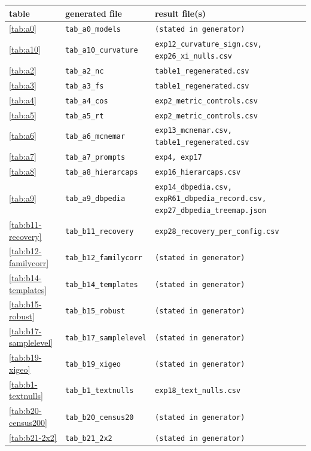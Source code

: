 \begin{table}[H]
\centering
\scriptsize
\begin{tabular}{lll}
\toprule
table & generated file & result file(s) \\
\midrule
\ref{tab:a0} & \texttt{tab\_a0\_models} & \texttt{(stated in generator)} \\
\ref{tab:a10} & \texttt{tab\_a10\_curvature} & \texttt{exp12\_curvature\_sign.csv, exp26\_xi\_nulls.csv} \\
\ref{tab:a2} & \texttt{tab\_a2\_nc} & \texttt{table1\_regenerated.csv} \\
\ref{tab:a3} & \texttt{tab\_a3\_fs} & \texttt{table1\_regenerated.csv} \\
\ref{tab:a4} & \texttt{tab\_a4\_cos} & \texttt{exp2\_metric\_controls.csv} \\
\ref{tab:a5} & \texttt{tab\_a5\_rt} & \texttt{exp2\_metric\_controls.csv} \\
\ref{tab:a6} & \texttt{tab\_a6\_mcnemar} & \texttt{exp13\_mcnemar.csv, table1\_regenerated.csv} \\
\ref{tab:a7} & \texttt{tab\_a7\_prompts} & \texttt{exp4, exp17} \\
\ref{tab:a8} & \texttt{tab\_a8\_hierarcaps} & \texttt{exp16\_hierarcaps.csv} \\
\ref{tab:a9} & \texttt{tab\_a9\_dbpedia} & \texttt{exp14\_dbpedia.csv, expR61\_dbpedia\_record.csv, exp27\_dbpedia\_treemap.json} \\
\ref{tab:b11-recovery} & \texttt{tab\_b11\_recovery} & \texttt{exp28\_recovery\_per\_config.csv} \\
\ref{tab:b12-familycorr} & \texttt{tab\_b12\_familycorr} & \texttt{(stated in generator)} \\
\ref{tab:b14-templates} & \texttt{tab\_b14\_templates} & \texttt{(stated in generator)} \\
\ref{tab:b15-robust} & \texttt{tab\_b15\_robust} & \texttt{(stated in generator)} \\
\ref{tab:b17-samplelevel} & \texttt{tab\_b17\_samplelevel} & \texttt{(stated in generator)} \\
\ref{tab:b19-xigeo} & \texttt{tab\_b19\_xigeo} & \texttt{(stated in generator)} \\
\ref{tab:b1-textnulls} & \texttt{tab\_b1\_textnulls} & \texttt{exp18\_text\_nulls.csv} \\
\ref{tab:b20-census200} & \texttt{tab\_b20\_census20} & \texttt{(stated in generator)} \\
\ref{tab:b21-2x2} & \texttt{tab\_b21\_2x2} & \texttt{(stated in generator)} \\

\end{tabular}
\end{table}
